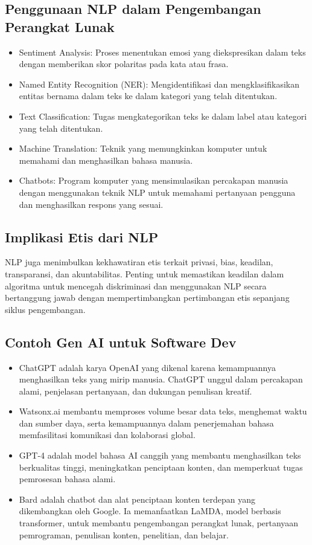 \documentclass{article}
\begin{document}
\subsection{Penggunaan NLP dalam Pengembangan Perangkat Lunak}
\begin{itemize}
    \item Sentiment Analysis: Proses menentukan emosi yang diekspresikan dalam teks dengan memberikan skor polaritas pada kata atau frasa.
    \item Named Entity Recognition (NER): Mengidentifikasi dan mengklasifikasikan entitas bernama dalam teks ke dalam kategori yang telah ditentukan.
    \item Text Classification: Tugas mengkategorikan teks ke dalam label atau kategori yang telah ditentukan.
    \item Machine Translation: Teknik yang memungkinkan komputer untuk memahami dan menghasilkan bahasa manusia.
    \item Chatbots: Program komputer yang mensimulasikan percakapan manusia dengan menggunakan teknik NLP untuk memahami pertanyaan pengguna dan menghasilkan respons yang sesuai.
\end{itemize}

\subsection{Implikasi Etis dari NLP}
NLP juga menimbulkan kekhawatiran etis terkait privasi, bias, keadilan, transparansi, dan akuntabilitas. Penting untuk memastikan keadilan dalam algoritma untuk mencegah diskriminasi dan menggunakan NLP secara bertanggung jawab dengan mempertimbangkan pertimbangan etis sepanjang siklus pengembangan.

\subsection{Contoh Gen AI untuk Software Dev}
\begin{itemize}
    \item ChatGPT adalah karya OpenAI yang dikenal karena kemampuannya menghasilkan teks yang mirip manusia. ChatGPT unggul dalam percakapan alami, penjelasan pertanyaan, dan dukungan penulisan kreatif.

    \item Watsonx.ai membantu memproses volume besar data teks, menghemat waktu dan sumber daya, serta kemampuannya dalam penerjemahan bahasa memfasilitasi komunikasi dan kolaborasi global.

    \item GPT-4 adalah model bahasa AI canggih yang membantu menghasilkan teks berkualitas tinggi, meningkatkan penciptaan konten, dan memperkuat tugas pemrosesan bahasa alami.

    \item Bard adalah chatbot dan alat penciptaan konten terdepan yang dikembangkan oleh Google. Ia memanfaatkan LaMDA, model berbasis transformer, untuk membantu pengembangan perangkat lunak, pertanyaan pemrograman, penulisan konten, penelitian, dan belajar.
\end{itemize}
\end{document}
